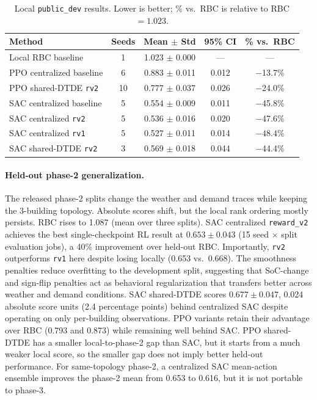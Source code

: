 \documentclass{article}
\begin{document}
\begin{table}[ht]
\centering
\small
\begin{tabular}{lcccc}
\toprule
\textbf{Method} & \textbf{Seeds} & \textbf{Mean $\pm$ Std} & \textbf{95\% CI} & \textbf{\% vs.\ RBC} \\
\midrule
Local RBC baseline        & 1  & 1.023 $\pm$ 0.000 & ---   & --- \\
PPO centralized baseline  & 6  & 0.883 $\pm$ 0.011 & 0.012 & $-$13.7\% \\
PPO shared-DTDE \texttt{rv2}    & 10 & 0.777 $\pm$ 0.037 & 0.026 & $-$24.0\% \\
SAC centralized baseline  & 5  & 0.554 $\pm$ 0.009 & 0.011 & $-$45.8\% \\
SAC centralized \texttt{rv2}    & 5  & 0.536 $\pm$ 0.016 & 0.020 & $-$47.6\% \\
SAC centralized \texttt{rv1}    & 5  & 0.527 $\pm$ 0.011 & 0.014 & $-48.4\%$ \\
SAC shared-DTDE \texttt{rv2}    & 3  & 0.569 $\pm$ 0.018 & 0.044 & $-$44.4\% \\
\bottomrule
\end{tabular}
\caption{Local \texttt{public\_dev} results. Lower is better; \% vs.\ RBC is relative to RBC $=1.023$.}
\label{tab:local}
\end{table}

\paragraph{Held-out phase-2 generalization.} The released phase-2 splits change the weather and demand traces while keeping the 3-building topology. Absolute scores shift, but the local rank ordering mostly persists. RBC rises to 1.087 (mean over three splits). SAC centralized \texttt{reward\_v2} achieves the best single-checkpoint RL result at $0.653 \pm 0.043$ (15 seed $\times$ split evaluation jobs), a 40\% improvement over held-out RBC. Importantly, \texttt{rv2} outperforms \texttt{rv1} here despite losing locally (0.653 vs.\ 0.668). The smoothness penalties reduce overfitting to the development split, suggesting that SoC-change and sign-flip penalties act as behavioral regularization that transfers better across weather and demand conditions. SAC shared-DTDE scores $0.677 \pm 0.047$, 0.024 absolute score units (2.4 percentage points) behind centralized SAC despite operating on only per-building observations. PPO variants retain their advantage over RBC (0.793 and 0.873) while remaining well behind SAC. PPO shared-DTDE has a smaller local-to-phase-2 gap than SAC, but it starts from a much weaker local score, so the smaller gap does not imply better held-out performance. For same-topology phase-2, a centralized SAC mean-action ensemble improves the phase-2 mean from 0.653 to 0.616, but it is not portable to phase-3.
\end{document}
